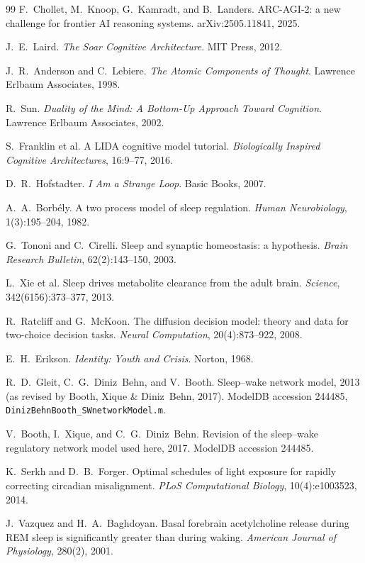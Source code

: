 \documentclass[11pt]{article}
\newcommand{\code}[1]{\texttt{\small #1}}
\begin{document}
\begin{thebibliography}{99}
 F.~Chollet, M.~Knoop, G.~Kamradt, and B.~Landers.
ARC-AGI-2: a new challenge for frontier AI reasoning systems.
arXiv:2505.11841, 2025.

 J.~E.~Laird. \emph{The Soar Cognitive Architecture}.
MIT Press, 2012.

 J.~R.~Anderson and C.~Lebiere. \emph{The Atomic
Components of Thought}. Lawrence Erlbaum Associates, 1998.

 R.~Sun. \emph{Duality of the Mind: A Bottom-Up
Approach Toward Cognition}. Lawrence Erlbaum Associates, 2002.

 S.~Franklin et al. A LIDA cognitive model tutorial.
\emph{Biologically Inspired Cognitive Architectures}, 16:9--77, 2016.

 D.~R.~Hofstadter. \emph{I Am a Strange Loop}.
Basic Books, 2007.

 A.~A.~Borb\'ely. A two process model of sleep
regulation. \emph{Human Neurobiology}, 1(3):195--204, 1982.

 G.~Tononi and C.~Cirelli. Sleep and synaptic
homeostasis: a hypothesis. \emph{Brain Research Bulletin},
62(2):143--150, 2003.

 L.~Xie et al. Sleep drives metabolite clearance from the
adult brain. \emph{Science}, 342(6156):373--377, 2013.

 R.~Ratcliff and G.~McKoon. The diffusion decision
model: theory and data for two-choice decision tasks. \emph{Neural
Computation}, 20(4):873--922, 2008.

 E.~H.~Erikson. \emph{Identity: Youth and Crisis}.
Norton, 1968.


 R.~D.~Gleit, C.~G.~Diniz~Behn, and V.~Booth.
Sleep--wake network model, 2013 (as revised by Booth, Xique \&
Diniz~Behn, 2017). ModelDB accession 244485,
\code{DinizBehnBooth\_SWnetworkModel.m}.

 V.~Booth, I.~Xique, and C.~G.~Diniz~Behn. Revision
of the sleep--wake regulatory network model used here, 2017. ModelDB
accession 244485.

 K.~Serkh and D.~B.~Forger. Optimal schedules of light
exposure for rapidly correcting circadian misalignment. \emph{PLoS
Computational Biology}, 10(4):e1003523, 2014.

 J.~Vazquez and H.~A.~Baghdoyan. Basal forebrain
acetylcholine release during REM sleep is significantly greater than
during waking. \emph{American Journal of Physiology}, 280(2), 2001.


\end{thebibliography}
\end{document}
